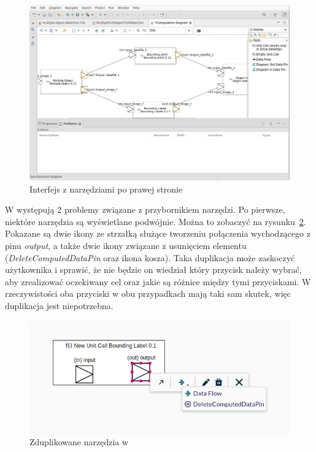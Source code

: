\begin{figure}[!ht]
  \centering

  \includegraphics[width=0.95\linewidth]{./images/sirius-desktop-model-editor.png}
  \caption{Interfejs \SiriusDesktop{} z narzędziami po prawej
    stronie}\label{rys:sirius-desktop-model-editor-tools-right}
\end{figure}

W \SiriusWeb{} występują 2 problemy związane z przybornikiem narzędzi. Po
pierwsze, niektóre narzędzia są wyświetlane podwójnie. Można to zobaczyć na
rysunku~\ref{rys:sirius-web-duplicate-tools}. Pokazane są dwie ikony ze
strzałką służące tworzeniu połączenia wychodzącego z pinu \emph{output}, a
także dwie ikony związane z usunięciem elementu (\emph{DeleteComputedDataPin}
oraz ikona kosza). Taka duplikacja może zaskoczyć użytkownika i sprawić, że nie
będzie on wiedział który przycisk należy wybrać, aby zrealizować oczekiwany cel
oraz jakie są różnice między tymi przyciskami. W rzeczywistości oba przyciski w
obu przypadkach mają taki sam skutek, więc duplikacja jest niepotrzebna.

\begin{figure}[!ht]
  \centering

  \includegraphics[width=0.95\linewidth]{./images/sirius-web-duplicate-tools.png}
  \caption{Zduplikowane narzędzia w \SiriusWeb{}}\label{rys:sirius-web-duplicate-tools}
\end{figure}

